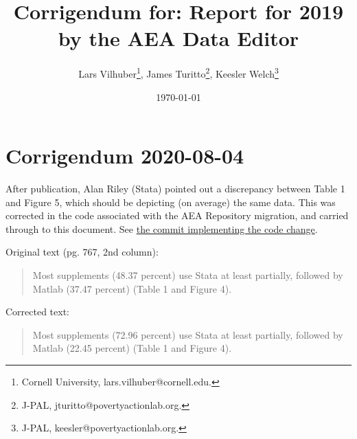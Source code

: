 \documentclass[PP]{AEA}
\begin{document}
\title{Corrigendum for: Report for 2019 by the AEA Data Editor }
\author{Lars Vilhuber\thanks{%
Cornell University, lars.vilhuber@cornell.edu. },
 James Turitto\thanks{%
J-PAL, jturitto@povertyactionlab.org.},
Keesler Welch\thanks{%
J-PAL, keesler@povertyactionlab.org.}
}
\date{\today}
\pubIssue{--}
\JEL{}




\maketitle


\section*{Corrigendum 2020-08-04}

After publication, Alan Riley (Stata) pointed out a discrepancy between Table 1 and Figure 5, which should be depicting (on average) the same data. This was corrected in the code associated with the AEA Repository migration, and carried through to this document. See \href{https://github.com/AEADataEditor/aea-supplement-migration/commit/530f1e9ad8059e68815b5836db33155c990154b0}{the commit implementing the code change}.

Original text (pg. 767, 2nd column):
\begin{quote}
Most supplements (48.37 percent) use Stata at least partially, followed by
Matlab (37.47 percent) (Table 1 and Figure 4).
\end{quote}

Corrected text:
\begin{quote}
Most supplements (72.96 percent) use Stata at least partially, followed by
Matlab (22.45 percent) (Table 1 and Figure 4).
\end{quote}
\end{document}
